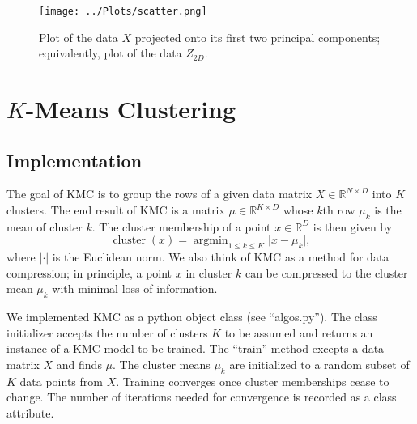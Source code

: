 \documentclass[12pt]{article}
\newcommand{\RR}{\mathbb{R}}
\newcommand{\argmin}{\operatorname{argmin}}
\begin{document}
\begin{figure}
\centering
\texttt{[image: ../Plots/scatter.png]}
\caption{\label{scatter} Plot of the data $X$ projected onto its first two principal components; equivalently, plot of the data $Z_{2D}$.}
\end{figure}

\section{$K$-Means Clustering}

\subsection{Implementation}

The goal of KMC is to group the rows of a given data matrix $X\in\mathbb{R}^{N\times D}$ into $K$ clusters. The end result of KMC is a matrix $\mu\in \mathbb{R}^{K\times D}$ whose $k$th row $\mu_k$ is the mean of cluster $k$. The cluster membership of a point $x\in\RR^D$ is then given by
\[ \operatorname{cluster}(x) = \argmin_{1\leq k\leq K} \lvert x-\mu_k\rvert, \]
where $\lvert\cdot\rvert$ is the Euclidean norm. We also think of KMC as a method for data compression; in principle, a point $x$ in cluster $k$ can be compressed to the cluster mean $\mu_k$ with minimal loss of information.

We implemented KMC as a python object class (see ``algos.py''). The class initializer accepts the number of clusters $K$ to be assumed and returns an instance of a KMC model to be trained. The ``train'' method excepts a data matrix $X$ and finds $\mu$. The cluster means $\mu_k$ are initialized to a random subset of $K$ data points from $X$. Training converges once cluster memberships cease to change. The number of iterations needed for convergence is recorded as a class attribute.
\end{document}
